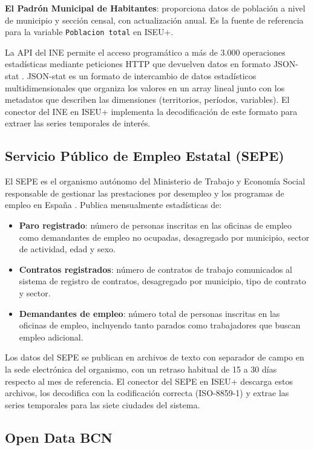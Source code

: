 \textbf{El Padrón Municipal de Habitantes}: proporciona datos de población a nivel de municipio y sección censal, con actualización anual. Es la fuente de referencia para la variable \texttt{Poblacion total} en ISEU+.

La API del INE \parencite{INE2022API} permite el acceso programático a más de 3.000 operaciones estadísticas mediante peticiones HTTP que devuelven datos en formato JSON-stat \parencite{JSONstat2023}. JSON-stat es un formato de intercambio de datos estadísticos multidimensionales que organiza los valores en un array lineal junto con los metadatos que describen las dimensiones (territorios, períodos, variables). El conector del INE en ISEU+ implementa la decodificación de este formato para extraer las series temporales de interés.

\subsection{Servicio Público de Empleo Estatal (SEPE)}

El SEPE es el organismo autónomo del Ministerio de Trabajo y Economía Social responsable de gestionar las prestaciones por desempleo y los programas de empleo en España \parencite{SEPE2023Institucional}. Publica mensualmente estadísticas de:

\begin{itemize}
  \item \textbf{Paro registrado}: número de personas inscritas en las oficinas de empleo como demandantes de empleo no ocupadas, desagregado por municipio, sector de actividad, edad y sexo.
  \item \textbf{Contratos registrados}: número de contratos de trabajo comunicados al sistema de registro de contratos, desagregado por municipio, tipo de contrato y sector.
  \item \textbf{Demandantes de empleo}: número total de personas inscritas en las oficinas de empleo, incluyendo tanto parados como trabajadores que buscan empleo adicional.
\end{itemize}

Los datos del SEPE se publican en archivos de texto con separador de campo en la sede electrónica del organismo, con un retraso habitual de 15 a 30 días respecto al mes de referencia. El conector del SEPE en ISEU+ descarga estos archivos, los decodifica con la codificación correcta (ISO-8859-1) y extrae las series temporales para las siete ciudades del sistema.

\subsection{Open Data BCN}

